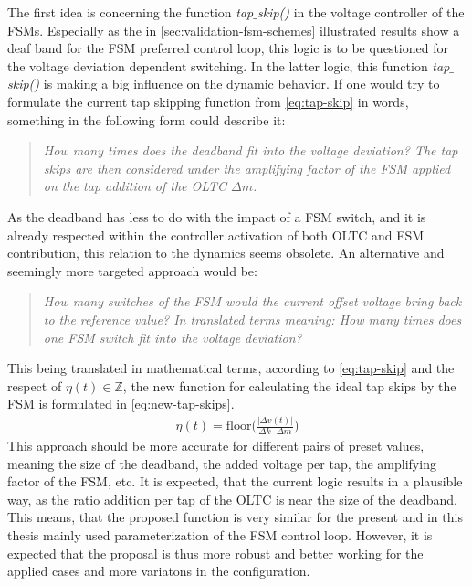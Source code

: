 The first idea is concerning the function \textit{tap$\_$skip()} in the voltage controller of the \acsp{FSM}.
Especially as the in \autoref{sec:validation-fsm-schemes} illustrated results show a deaf band for the \acs{FSM} preferred control loop, this logic is to be questioned for the voltage deviation dependent switching.
In the latter logic, this function \textit{tap$\_$skip()} is making a big influence on the dynamic behavior.
If one would try to formulate the current tap skipping function from \autoref{eq:tap-skip} in words, something in the following form could describe it: 
\begin{quote} \itshape
        How many times does the deadband fit into the voltage deviation? The tap skips are then considered under the amplifying factor of the \acs{FSM} applied on the tap addition of the \acs{OLTC} $\Delta m$.
\end{quote}
As the deadband has less to do with the impact of a \acs{FSM} switch, and it is already respected within the controller activation of both \acs{OLTC} and \acs{FSM} contribution, this relation to the dynamics seems obsolete.
An alternative and seemingly more targeted approach would be: 
\begin{quote} \itshape
        How many switches of the \acs{FSM} would the current offset voltage bring back to the reference value?
        In translated terms meaning: How many times does one \acs{FSM} switch fit into the voltage deviation?
\end{quote}
This being translated in mathematical terms, according to \autoref{eq:tap-skip} and the respect of $\eta(t) \in \mathbb{Z}$, the new function for calculating the ideal tap skips by the \acs{FSM} is formulated in \autoref{eq:new-tap-skips}.
\begin{align}
        \eta(t)=\text{floor}\bigg(\frac{\vert \Delta v(t)\vert}{\Delta k \cdot \Delta m}\bigg) \label{eq:new-tap-skips}
\end{align}
This approach should be more accurate for different pairs of preset values, meaning the size of the deadband, the added voltage per tap, the amplifying factor of the \acs{FSM}, etc.
It is expected, that the current logic results in a plausible way, as the ratio addition per tap of the \acs{OLTC} is near the size of the deadband.
This means, that the proposed function is very similar for the present and in this thesis mainly used parameterization of the \acs{FSM} control loop.
However, it is expected that the proposal is thus more robust and better working for the applied cases and more variatons in the configuration.

